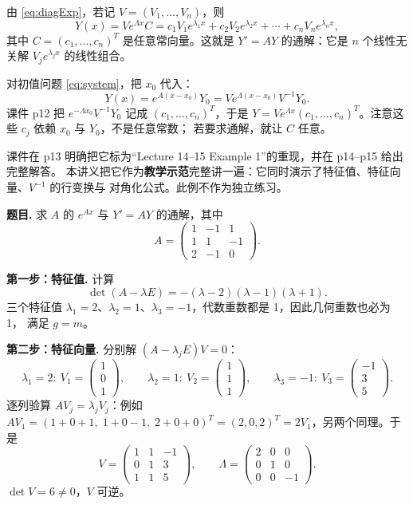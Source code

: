 \documentclass[11pt]{ctexart}
\newcommand{\pmat}[1]{\begin{pmatrix}#1\end{pmatrix}}
\begin{document}

由 \eqref{eq:diagExp}，若记 $V=(V_1,\dots,V_n)$，则
\[
Y(x)=Ve^{\Lambda x}C
=c_1V_1e^{\lambda_1x}+c_2V_2e^{\lambda_2x}+\cdots+c_nV_ne^{\lambda_nx},
\]
其中 $C=(c_1,\dots,c_n)^T$ 是任意常向量。这就是 $Y'=AY$ 的通解：它是 $n$ 个线性无关解
$V_je^{\lambda_jx}$ 的线性组合。

对初值问题 \eqref{eq:system}，把 $x_0$ 代入：
\[
Y(x)=e^{A(x-x_0)}Y_0=Ve^{\Lambda(x-x_0)}V^{-1}Y_0 .
\]
课件 p12 把 $e^{-\Lambda x_0}V^{-1}Y_0$ 记成 $(c_1,\dots,c_n)^T$，于是
$Y=Ve^{\Lambda x}(c_1,\dots,c_n)^T$。注意这些 $c_j$ 依赖 $x_0$ 与 $Y_0$，不是任意常数；
若要求通解，就让 $C$ 任意。


课件在 p13 明确把它标为“Lecture 14--15 Example 1”的重现，并在 p14--p15 给出完整解答。
本讲义把它作为\textbf{教学示范}完整讲一遍：它同时演示了特征值、特征向量、$V^{-1}$ 的行变换与
对角化公式。此例不作为独立练习。

\textbf{题目.} 求 $A$ 的 $e^{Ax}$ 与 $Y'=AY$ 的通解，其中
\[
A=\pmat{1&-1&1\\1&1&-1\\2&-1&0}.
\]

\textbf{第一步：特征值.} 计算
\[
\det(A-\lambda E)=-(\lambda-2)(\lambda-1)(\lambda+1).
\]
三个特征值 $\lambda_1=2$、$\lambda_2=1$、$\lambda_3=-1$，代数重数都是 1，因此几何重数也必为 1，
满足 $g=m$。

\textbf{第二步：特征向量.} 分别解 $(A-\lambda_jE)V=0$：
\[
\lambda_1=2:\ V_1=\pmat{1\\0\\1},\qquad
\lambda_2=1:\ V_2=\pmat{1\\1\\1},\qquad
\lambda_3=-1:\ V_3=\pmat{-1\\3\\5}.
\]
逐列验算 $AV_j=\lambda_jV_j$：例如
$AV_1=(1+0+1,\;1+0-1,\;2+0+0)^T=(2,0,2)^T=2V_1$，另两个同理。于是
\[
V=\pmat{1&1&-1\\0&1&3\\1&1&5},\qquad
\Lambda=\pmat{2&0&0\\0&1&0\\0&0&-1}.
\]
$\det V=6\ne0$，$V$ 可逆。
\end{document}
